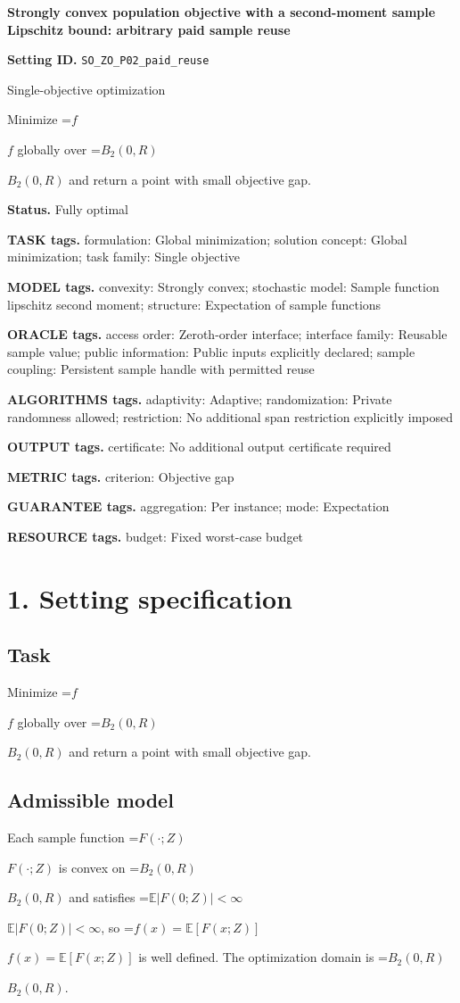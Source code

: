 \documentclass[10pt,a4paper]{article}
\newcommand{\AtlasMath}[1]{\par\begingroup\centering\setbox0=\hbox{$\displaystyle #1$}\ifdim\wd0>1.4\linewidth\typeout{ATLAS WIDE FORMULA: \the\wd0}\fi\ifdim\wd0>\linewidth\resizebox{\linewidth}{!}{\box0}\else\box0\fi\par\endgroup}
\newcommand{\AtlasInlineMath}[1]{\begingroup\setbox0=\hbox{$#1$}\ifdim\wd0>.4\linewidth\endgroup\AtlasMath{#1}\else\endgroup$#1$\fi}
\begin{document}
\raggedright

{\LARGE\bfseries\sffamily\color{AtlasNavy} Strongly convex population objective with a second-moment sample Lipschitz bound: arbitrary paid sample reuse\par}\vspace{5pt}
\textbf{Setting ID.} \texttt{SO\_\allowbreak{}ZO\_\allowbreak{}P02\_\allowbreak{}paid\_\allowbreak{}reuse}

Single-objective optimization

Minimize \AtlasInlineMath{f} globally over \AtlasInlineMath{B_2(0,R)} and return a point with small objective gap.

\textbf{Status.} Fully optimal

\textbf{TASK tags.} formulation: Global minimization; solution concept: Global minimization; task family: Single objective

\textbf{MODEL tags.} convexity: Strongly convex; stochastic model: Sample function lipschitz second moment; structure: Expectation of sample functions

\textbf{ORACLE tags.} access order: Zeroth-order interface; interface family: Reusable sample value; public information: Public inputs explicitly declared; sample coupling: Persistent sample handle with permitted reuse

\textbf{ALGORITHMS tags.} adaptivity: Adaptive; randomization: Private randomness allowed; restriction: No additional span restriction explicitly imposed

\textbf{OUTPUT tags.} certificate: No additional output certificate required

\textbf{METRIC tags.} criterion: Objective gap

\textbf{GUARANTEE tags.} aggregation: Per instance; mode: Expectation

\textbf{RESOURCE tags.} budget: Fixed worst-case budget

\section{1. Setting specification}
\subsection{Task}
Minimize \AtlasInlineMath{f} globally over \AtlasInlineMath{B_2(0,R)} and return a point with small objective gap.

\subsection{Admissible model}
Each sample function \AtlasInlineMath{F(\cdot;Z)} is convex on \AtlasInlineMath{B_2(0,R)} and satisfies \AtlasInlineMath{\mathbb{E}|F(0;Z)|<\infty}, so \AtlasInlineMath{f(x)=\mathbb{E}[F(x;Z)]} is well defined. The optimization domain is \AtlasInlineMath{B_2(0,R)}.
\end{document}
